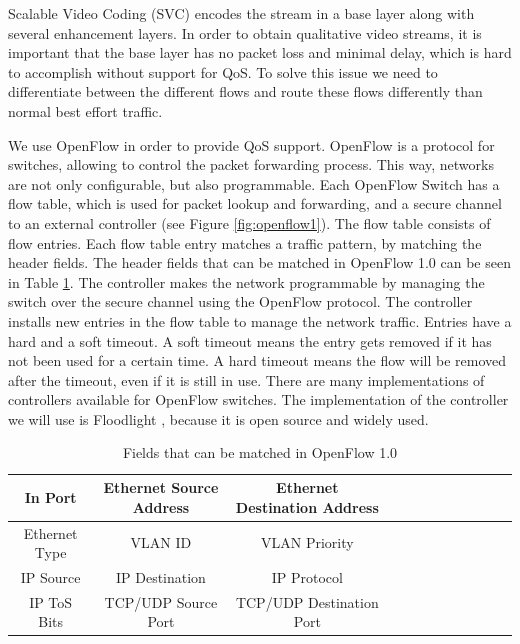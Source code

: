 \documentclass[conference]{IEEEtran}
\begin{document}
Scalable Video Coding (SVC) \cite{schwarz2007overview} encodes the stream in a base layer along with several enhancement layers. 
In order to obtain qualitative video streams, it is important that the base layer has no 
packet loss and minimal delay, which is hard to accomplish without support for QoS. 
To solve this issue we need to differentiate between the different flows and route these flows 
differently than normal best effort traffic.

We use OpenFlow \cite{mckeown2008openflow} in order to provide QoS support. 
OpenFlow is a protocol for switches, allowing to control the packet forwarding process.
This way, networks are not only configurable, but also programmable.
Each OpenFlow Switch has a flow table, which is used for packet lookup and 
forwarding, and a secure channel to an external controller (see Figure \ref{fig:openflow1}). 
The flow table consists of flow entries.
Each flow table entry matches a traffic pattern, by matching the header fields.
The header fields that can be matched in OpenFlow 1.0 can be seen in Table \ref{tab:matchedflows}.
The controller makes the network programmable by managing the switch over 
the secure channel using the OpenFlow protocol.
The controller installs new entries in the flow table to manage the network traffic.
Entries have a hard and a soft timeout. A soft timeout means the entry gets removed if it has not been used for a certain time.
A hard timeout means the flow will be removed after the timeout, even if it is still in use.
There are many implementations of controllers available for OpenFlow switches.
The implementation of the controller we will use is Floodlight \cite{floodlight}, because it is open source and widely used.

\begin{table}[htb]
\centering
\begin{tabular}{| c | *{11}{c|}}
\hline 
In Port & Ethernet Source Address & Ethernet Destination Address \\ \hline
Ethernet Type & VLAN ID & VLAN Priority \\ \hline
IP Source & IP Destination & IP Protocol \\ \hline
IP ToS Bits & TCP/UDP Source Port & TCP/UDP Destination Port\\ \hline 
\end{tabular}
\caption{Fields that can be matched in OpenFlow 1.0}
\label{tab:matchedflows}
\end{table}
\end{document}
